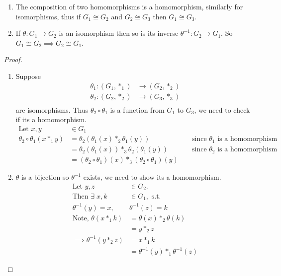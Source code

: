 \begin{lemma} \mbox{} 
\begin{enumerate}
\def\labelenumi{\roman{enumi}.}
  \item The composition of two homomorphisms is a homomorphism, similarly for isomorphisms, thus if \(G_1 \cong G_2\) and \(G_2 \cong G_3\) then \(G_1 \cong G_3\).
  \item
    If \(\theta : G_1 \to G_2\) is an isomorphism then so is its inverse \(\theta^{-1} : G_2 \to G_1\).
    So \(G_1 \cong G_2 \implies G_2 \cong G_1\).
\end{enumerate}

\end{lemma}

\begin{proof} \mbox{} 

\begin{enumerate}
\def\labelenumi{\roman{enumi}.}
  \item Suppose
  \begin{align*}
      \theta_1 : (G_1, *_1) &\to (G_2, *_2) \\
      \theta_2 : (G_2, *_2) &\to (G_3, *_3) \\
  \end{align*}
  are isomorphisms.
  Thus \(\theta_2 \circ \theta_1\) is a function from \(G_1\) to \(G_3\), we need to check if its a homomorphism.
  \begin{align*}
      \text{Let } x, y &\in G_1 && \\
      \theta_2 \circ \theta_1 (x *_1 y) &= \theta_2(\theta_1(x) *_2 \theta_1(y)) & &\text{ since $\theta_1$ is a homomorphism} \\
      &= \theta_2(\theta_1(x)) *_3 \theta_2(\theta_1(y)) & &\text{ since $\theta_2$ is a homomorphism} \\
      &= (\theta_2 \circ \theta_1)(x) *_3 (\theta_2 \circ \theta_1)(y) &&
  \end{align*}
  \item
    \(\theta\) is a bijection so \(\theta^{-1}\) exists, we need to show its a homomorphism.
    \begin{align*}
    \text{Let } y, z &\in G_2. \\
    \text{Then } \exists \; x, k &\in G_1, \text{ s.t.} \\
    \theta^{-1}(y) = x,\ &\theta^{-1}(z) = k \\
    \text{Note, } \theta(x *_1 k) &= \theta(x) *_2 \theta(k) \\
    &= y *_2 z \\
    \implies \theta^{-1}(y *_2 z) &= x *_1 k \\
    &= \theta^{-1}(y) *_1 \theta^{-1}(z)
    \end{align*}
\end{enumerate}
\end{proof}

